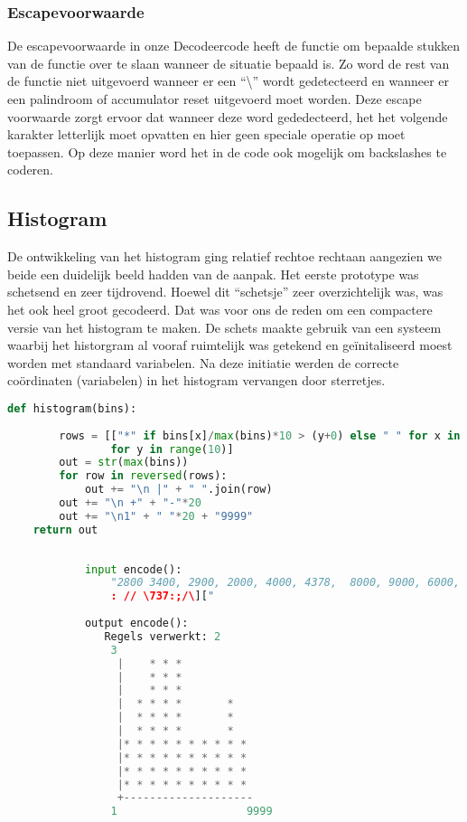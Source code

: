 \documentclass{article}
\begin{document}
    \subsubsection{Escapevoorwaarde}
    De escapevoorwaarde in onze Decodeercode heeft de functie om bepaalde
		stukken van de functie over te slaan wanneer de situatie bepaald is.
		Zo word de rest van de functie niet uitgevoerd wanneer er een ``\textbackslash'' wordt
		gedetecteerd en wanneer er een palindroom of accumulator reset uitgevoerd moet worden.
		Deze escape voorwaarde zorgt ervoor dat wanneer deze word gededecteerd,
		het het volgende karakter letterlijk moet opvatten en hier geen speciale
		operatie op moet toepassen.
		Op deze manier word het in de code ook mogelijk om backslashes te coderen.
    
    \subsection{Histogram}
      De ontwikkeling van het histogram ging relatief rechtoe rechtaan
			aangezien we beide een duidelijk beeld hadden van de aanpak.
			Het eerste prototype was schetsend en zeer tijdrovend.
			Hoewel dit ``schetsje'' zeer overzichtelijk was, was het ook heel
			groot gecodeerd. Dat was voor ons de reden om een compactere versie
			van het histogram te maken. De schets maakte gebruik van een systeem
			waarbij het historgram al vooraf ruimtelijk was getekend en
			ge\"initaliseerd moest worden met standaard variabelen.
			Na deze initiatie werden de correcte co\"ordinaten (variabelen)
			in het histogram vervangen door sterretjes. 
      \begin{lstlisting}[frame=single, language=python] 
    def histogram(bins):
    
        rows = [["*" if bins[x]/max(bins)*10 > (y+0) else " " for x in range(10)]
                for y in range(10)]
        out = str(max(bins))
        for row in reversed(rows):
            out += "\n |" + " ".join(row)
        out += "\n +" + "-"*20
        out += "\n1" + " "*20 + "9999"
    return out
      \end{lstlisting}
      
      \newpage
      \begin{lstlisting}[frame=single, language=python]  % Start your code-block
            
            input encode():
                "2800 3400, 2900, 2000, 4000, 4378,  8000, 9000, 6000, 5689, 3478, 4085, 7095, 1010,1785, 3000,8090
                : // \737:;/\]["
    
            output encode():
               Regels verwerkt: 2
                3
                 |    * * *          
                 |    * * *          
                 |    * * *          
                 |  * * * *       *  
                 |  * * * *       *  
                 |  * * * *       *  
                 |* * * * * * * * * *
                 |* * * * * * * * * *
                 |* * * * * * * * * *
                 |* * * * * * * * * *
                 +--------------------
                1                    9999
        \end{lstlisting}
      
\end{document}
